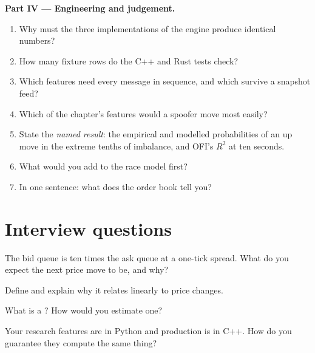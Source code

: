 \begin{problem}
\medskip\noindent\textbf{Part IV --- Engineering and judgement.}
\begin{enumerate}[resume]
\item Why must the three implementations of the engine produce identical numbers?
\item How many fixture rows do the C++ and Rust tests check?
\item Which features need every message in sequence, and which survive a snapshot feed?
\item Which of the chapter's features would a spoofer move most easily?
\item State the \emph{named result}: the empirical and modelled probabilities of an up move in the extreme tenths of imbalance, and OFI's
$R^2$ at ten seconds.
\item What would you add to the race model first?
\item In one sentence: what does the order book tell you?
\end{enumerate}
\end{problem}

\section{Interview questions}

\begin{interviewq}\label{iq:rs:order-book-features:1}
The bid queue is ten times the ask queue at a one-tick spread. What do you expect the next price move to be, and why?
\end{interviewq}

\begin{interviewq}\label{iq:rs:order-book-features:2}
Define  and explain why it relates linearly to price changes.
\end{interviewq}

\begin{interviewq}\label{iq:rs:order-book-features:3}
What is a ? How would you estimate one?
\end{interviewq}

\begin{interviewq}\label{iq:rs:order-book-features:4}
Your research features are in Python and production is in C++. How do you guarantee they compute the same thing?
\end{interviewq}

